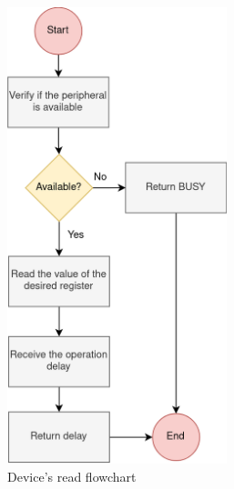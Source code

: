 \begin{figure}[t!]
	\centering
	\begin{subfigure}{0.4\textwidth}
		\includegraphics[width=0.7\textwidth]{Images/CrcReadFunction.png}
 		\caption[1\textwidth]{Device's read flowchart} 
	 	\label{fig_CrcReadFunction}
	\end{subfigure}
	\hspace{1cm}
	\begin{subfigure}{0.4\textwidth}
		\centering

\end{subfigure}
\end{figure}
